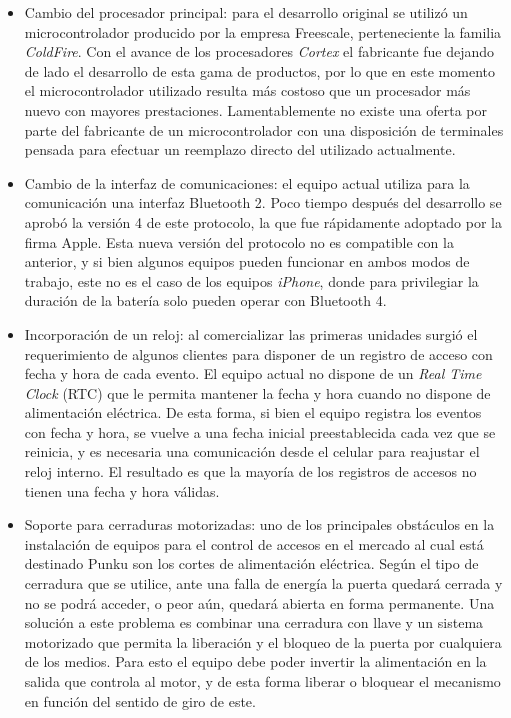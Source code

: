 \begin{itemize}
	\item Cambio del procesador principal: para el desarrollo original se utilizó un microcontrolador producido por la empresa Freescale, perteneciente la familia \emph{ColdFire}. Con el avance de los procesadores \emph{Cortex} el fabricante fue dejando de lado el desarrollo de esta gama de productos, por lo que en este momento el microcontrolador utilizado resulta más costoso que un procesador más nuevo con mayores prestaciones. Lamentablemente no existe una oferta por parte del fabricante de un microcontrolador con una disposición de terminales pensada para efectuar un reemplazo directo del utilizado actualmente.
	
	\item Cambio de la interfaz de comunicaciones: el equipo actual utiliza para la comunicación una interfaz Bluetooth 2. Poco tiempo después del desarrollo se aprobó la versión 4 de este protocolo, la que fue rápidamente adoptado por la firma Apple. Esta nueva versión del protocolo no es compatible con la anterior, y si bien algunos equipos pueden funcionar en ambos modos de trabajo, este no es el caso de los equipos \emph{iPhone}, donde para privilegiar la duración de la batería solo pueden operar con Bluetooth 4.
	
	\item Incorporación de un reloj: al comercializar las primeras unidades surgió el requerimiento de algunos clientes para disponer de un registro de acceso con fecha y hora de cada evento. El equipo actual no dispone de un \emph{Real Time Clock} (RTC) que le permita mantener la fecha y hora cuando no dispone de alimentación eléctrica. De esta forma, si bien el equipo registra los eventos con fecha y hora, se vuelve a una fecha inicial preestablecida cada vez que se reinicia, y es necesaria una comunicación desde el celular para reajustar el reloj interno. El resultado es que la mayoría de los registros de accesos no tienen una fecha y hora válidas.
	
	\item Soporte para cerraduras motorizadas: uno de los principales obstáculos en la instalación de equipos para el control de accesos en el mercado al cual está destinado Punku son los cortes de alimentación eléctrica. Según el tipo de cerradura que se utilice, ante una falla de energía la puerta quedará cerrada y no se podrá acceder, o peor aún, quedará abierta en forma permanente. Una solución a este problema es combinar una cerradura con llave y un sistema motorizado que permita la liberación y el bloqueo de la puerta por cualquiera de los medios. Para esto el equipo debe poder invertir la alimentación en la salida que controla al motor, y de esta forma liberar o bloquear el mecanismo en función del sentido de giro de este.
	

\end{itemize}
